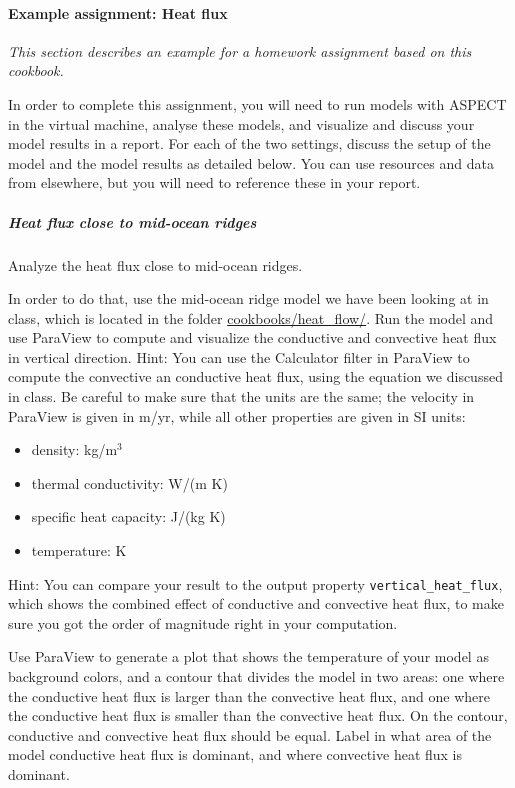 \paragraph{Example assignment: Heat flux}
\textit{This section describes an example for a homework assignment based on this cookbook.}

In order to complete this assignment, you will need to run models with ASPECT in the virtual machine, analyse these models, and visualize and discuss your model results in a report. For each of the two settings, discuss the setup of the model and the model results as detailed below. You can use resources and data from elsewhere, but you will need to reference these in your report.

\subparagraph{Heat flux close to mid-ocean ridges}
Analyze the heat flux close to mid-ocean ridges. 

In order to do that, use the mid-ocean ridge model we have been looking at in class, which is located in the folder \url{cookbooks/heat_flow/}. Run the model and use ParaView to compute and visualize the conductive and convective heat flux in vertical direction. 
Hint: You can use the Calculator filter in ParaView to compute the convective an conductive heat flux, using the equation we discussed in class. Be careful to make sure that the units are the same; the velocity in ParaView is given in m/yr, while all other properties are given in SI units:

\begin{itemize}
\item density: kg/m$^3$
\item thermal conductivity: W/(m K) 
\item specific heat capacity: J/(kg K) 
\item temperature: K 
\end{itemize}

Hint: You can compare your result to the output property \texttt{vertical\_heat\_flux}, which shows the combined effect of conductive and convective heat flux, to make sure you got the order of magnitude right in your computation. 

Use ParaView to generate a plot that shows the temperature of your model as background colors, 
and a contour that divides the model in two areas: one where the conductive heat flux is larger than the convective heat flux, and one where the conductive heat flux is smaller than the convective heat flux. On the contour, conductive and convective heat flux should be equal. 
Label in what area of the model conductive heat flux is dominant, and where convective heat flux is dominant. 


